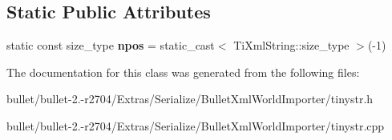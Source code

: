 \subsection*{Static Public Attributes}
\begin{DoxyCompactItemize}
\item 
\hypertarget{class_ti_xml_string_a4115be50cca61528f52822d35f213dbf}{static const size\+\_\+type {\bfseries npos} = static\+\_\+cast$<$ Ti\+Xml\+String\+::size\+\_\+type $>$(-\/1)}\label{class_ti_xml_string_a4115be50cca61528f52822d35f213dbf}

\end{DoxyCompactItemize}


The documentation for this class was generated from the following files\+:\begin{DoxyCompactItemize}
\item 
bullet/bullet-\/2.-\/r2704/\+Extras/\+Serialize/\+Bullet\+Xml\+World\+Importer/tinystr.\+h\item 
bullet/bullet-\/2.-\/r2704/\+Extras/\+Serialize/\+Bullet\+Xml\+World\+Importer/tinystr.\+cpp\end{DoxyCompactItemize}
